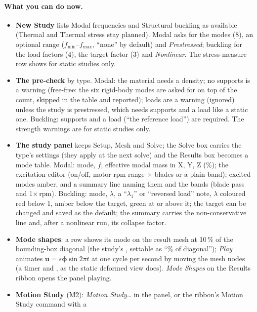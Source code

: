\paragraph{What you can do now.}
\begin{itemize}[nosep]
  \item \textbf{New Study} lists Modal frequencies and Structural buckling as available (Thermal and Thermal stress
        stay planned). Modal asks for the modes (8), an optional range ($f_{\min}$--$f_{\max}$, ``none'' by
        default) and \emph{Prestressed}; buckling for the load factors (4), the target factor (3) and
        \emph{Nonlinear}. The stress-measure row shows for static studies only.
  \item \textbf{The pre-check} by type. Modal: the material needs a density; no supports is a warning (free-free:
        the six rigid-body modes are asked for on top of the count, skipped in the table and reported); loads
        are a warning (ignored) unless the study is prestressed, which needs supports and a load like a static
        one. Buckling: supports and a load (``the reference load'') are required. The strength warnings are for
        static studies only.
  \item \textbf{The study panel} keeps Setup, Mesh and Solve; the Solve box carries the type's settings (they apply
        at the next solve) and the Results box becomes a mode table. Modal: mode, $f$, effective modal mass in
        X, Y, Z (\%); the excitation editor (on/off, motor rpm range $\times$ blades or a plain band); excited
        modes amber, and a summary line naming them and the bands (blade pass and 1$\times$\,rpm). Buckling:
        mode, $\lambda$, a ``$\lambda_1$'' or ``reversed load'' note, $\lambda$ coloured red below 1, amber below the
        target, green at or above it; the target can be changed and saved as the default; the summary carries
        the non-conservative line and, after a nonlinear run, its collapse factor.
  \item \textbf{Mode shapes}: a row shows its mode on the result mesh at 10\,\% of the bounding-box diagonal (the
        study's , settable as ``\% of diagonal''); \emph{Play} animates
        $\mathbf u=s\boldsymbol\phi\sin2\pi t$ at one cycle per second by moving the mesh nodes (a timer and
        , as the static deformed view does). \emph{Mode Shapes} on the Results ribbon opens
        the panel playing.
  \item \textbf{Motion Study} (M2): \emph{Motion Study\ldots} in the panel, or the ribbon's Motion Study command with a

\end{itemize}
